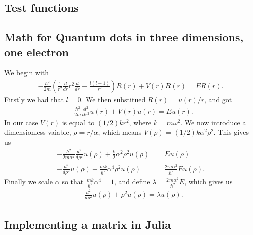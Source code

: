 \documentclass[a4paper]{article}
\begin{document}
\subsection{Test functions}\label{opp_c.jl}


\subsection{Math for Quantum dots in three dimensions, one electron}\label{opp d math}
We begin with 
\begin{align}
- \frac{\hbar^2}{2m} \left( \frac{1}{r^2} \frac{d}{dr} r^2 \frac{d}{dr} - \frac{l(l+1)}{r^2}\right) R(r) + V(r) R(r) = ER(r).
\end{align}
Firstly we had that $l=0$. We then substitued $R(r) = u(r)/r$, and got
\begin{align}
  -\frac{\hbar^2}{2 m} \frac{d^2}{dr^2} u(r) 
+ V(r)u(r)  = E u(r) .
\end{align}
In our case $V(r)$ is equal to $(1/2)kr^2$, where $k=m\omega^2$. We now introduce a dimensionless vaiable, $\rho = r/\alpha$, which means $V(\rho) = (1/2) k \alpha^2\rho^2$. This gives us
\begin{align}
-\frac{\hbar^2}{2 m \alpha^2} \frac{d^2}{d\rho^2} u(\rho) 
+ \frac{k}{2} \alpha^2\rho^2u(\rho)  &= E u(\rho) \\
 -\frac{d^2}{d\rho^2} u(\rho) 
+ \frac{mk}{\hbar^2} \alpha^4\rho^2u(\rho)  &= \frac{2m\alpha^2}{\hbar^2}E u(\rho) .
\end{align}
Finally we scale $\alpha$ so that $\frac{mk}{\hbar^2} \alpha^4 = 1$, and define $\lambda = \frac{2m\alpha^2}{\hbar^2}E$, which gives us
\begin{align}
  -\frac{d^2}{d\rho^2} u(\rho) + \rho^2u(\rho)  = \lambda u(\rho) .
\end{align}


\subsection{Implementing a matrix in Julia}\label{opp_d matrix}

\end{document}
